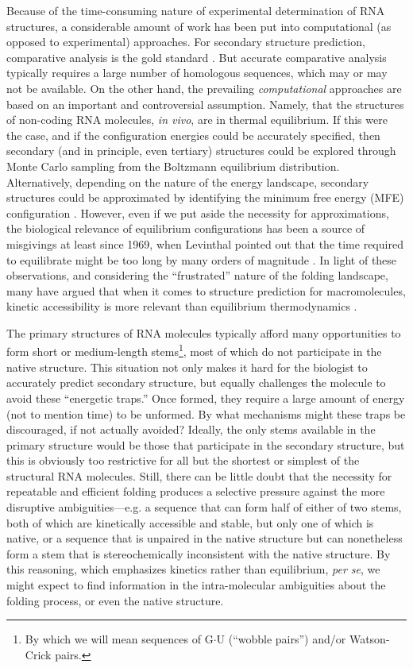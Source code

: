 \documentclass[10pt,letterpaper]{article}
\begin{document}
Because of the time-consuming nature of experimental determination of RNA structures, a considerable amount of work has been put into computational (as opposed to experimental) approaches. For secondary structure prediction, comparative analysis is the gold standard  \cite{Gutell1992-hu}. But accurate comparative analysis typically requires a large number of homologous sequences, which may or may not be available. On the other hand, the prevailing {\em computational} approaches are based on an important and controversial assumption\cite{Flamm2008-ir}. Namely, that the structures of  non-coding RNA molecules, {\em in vivo}, are in thermal equilibrium. If this were the case, and if the configuration energies could be accurately specified, then secondary (and in principle, even tertiary) structures could be explored through Monte Carlo sampling from the Boltzmann equilibrium distribution. Alternatively, depending on the nature of the energy landscape, secondary structures could be approximated by identifying the minimum free energy (MFE) configuration  \cite{Mathews1999-hc,Zuker1999-rc}. However, even if we put aside the necessity for approximations, the biological relevance of equilibrium configurations has been a source of misgivings at least since 1969, when Levinthal pointed out that the time required to equilibrate might be too long by many orders of magnitude  \cite{Levinthal1969-hi}. In light of these observations, and considering the ``frustrated'' nature of the folding landscape, many have argued that when it comes to structure prediction for macromolecules, kinetic accessibility is more relevant than equilibrium thermodynamics  \cite{Higgs2000-gj,Flamm2008-ir,Baker1994-px}.

The primary structures of RNA molecules typically afford many opportunities to form short or medium-length stems\footnote{
By which we will mean sequences of G$\cdot$U (``wobble pairs'') and/or Watson-Crick pairs.},
most of which do not participate in the native structure. This situation not only makes it hard for the biologist to accurately predict secondary structure, but equally challenges the molecule to avoid these ``energetic traps.'' Once formed, they require a large amount of energy (not to mention time) to be unformed. By what mechanisms might these traps be discouraged, if not actually avoided? 
Ideally, the only stems available in the primary structure would be those that participate in the secondary structure, but this is obviously too restrictive for all but the shortest or simplest of the structural RNA molecules. Still, there can be little doubt that the necessity for repeatable and efficient folding produces a selective pressure against the more disruptive ambiguities---e.g.
a sequence that can form half of either of two stems, both of which are kinetically accessible and stable, but only one of which is native, or a sequence that is unpaired in the native structure but can nonetheless form a stem that is stereochemically inconsistent with the native structure. By this reasoning, which emphasizes kinetics rather than equilibrium, {\em per se}, we might expect to find information in the intra-molecular ambiguities about the folding process, or even the native structure.  
\end{document}
